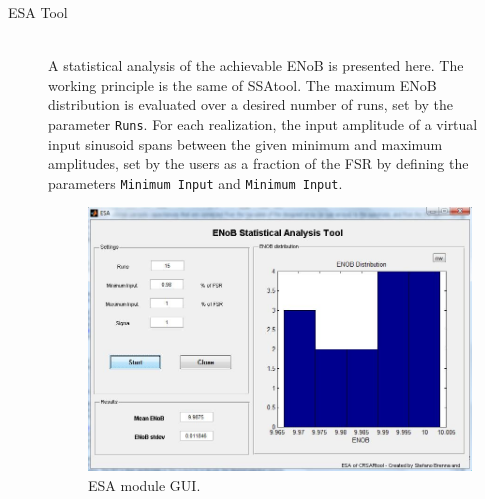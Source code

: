 \begin{description}
	\item[ESA Tool] \hfill \\
	A statistical analysis of the achievable ENoB is presented here. The working principle is the same of SSAtool. The maximum ENoB distribution is evaluated over a desired number of runs, set by the parameter \texttt{Runs}. For each realization, the input amplitude of a virtual input sinusoid spans between the given minimum and maximum amplitudes, set by the users as a fraction of the FSR by defining the parameters \texttt{Minimum Input} and  \texttt{Minimum Input}.

\begin{figure}[h!]
	\centering
	\includegraphics[scale=0.5]{pics/ESA.jpg}
	\caption{ESA module GUI.}
	\label{fig:esa}
\end{figure}



\end{description}